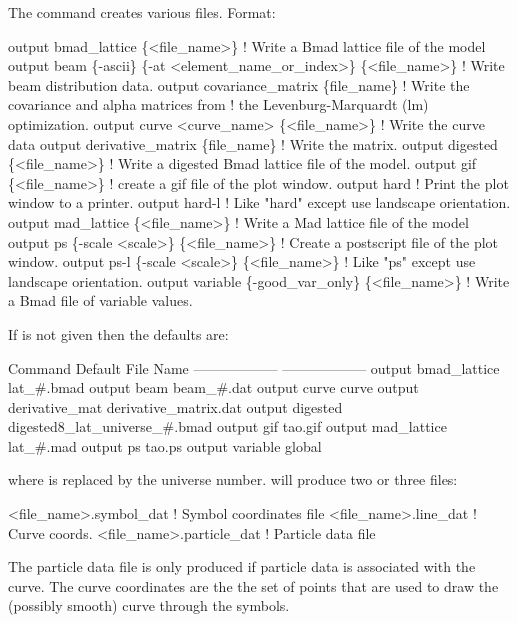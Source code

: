 The  command creates various files.
Format:
\begin{example}
  output bmad_lattice \{<file_name>\}       ! Write a Bmad lattice file of the model
  output beam \{-ascii\} \{-at <element_name_or_index>\} \{<file_name>\} 
                                          ! Write beam distribution data.
  output covariance_matrix \{file_name\}    ! Write the covariance and alpha matrices from 
                                          !   the Levenburg-Marquardt (lm) optimization.
  output curve <curve_name> \{<file_name>\} ! Write the curve data
  output derivative_matrix \{file_name\}    ! Write the  matrix.
  output digested \{<file_name>\}     ! Write a digested Bmad lattice file of the model.
  output gif \{<file_name>\}          ! create a gif file of the plot window.
  output hard                       ! Print the plot window to a printer.
  output hard-l                     ! Like "hard" except use landscape orientation. 
  output mad_lattice \{<file_name>\}  ! Write a Mad lattice file of the model
  output ps \{-scale <scale>\} \{<file_name>\}      ! Create a postscript file of the plot window.
  output ps-l \{-scale <scale>\} \{<file_name>\}    ! Like "ps" except use landscape orientation.
  output variable \{-good_var_only\} \{<file_name>\} ! Write a Bmad file of variable values.
\end{example}

\vskip 0.2in 

If  is not given then the defaults are:
\begin{example}
  Command                         Default File Name
  ------------------              ------------------
  output bmad_lattice             lat_#.bmad
  output beam                     beam_#.dat
  output curve                    curve
  output derivative_mat           derivative_matrix.dat              
  output digested                 digested8_lat_universe_#.bmad
  output gif                      tao.gif
  output mad_lattice              lat_#.mad
  output ps                       tao.ps
  output variable                 global%
\end{example}
where \vn{\#} is replaced by the universe number.  will produce two or three files: 
\begin{example}
  <file_name>.symbol_dat    ! Symbol coordinates file
  <file_name>.line_dat      ! Curve coords.
  <file_name>.particle_dat  ! Particle data file
\end{example}
The particle data file is only produced if particle
data is associated with the curve.
The curve coordinates are the the set of points that are used to draw the
(possibly smooth) curve through the symbols.

